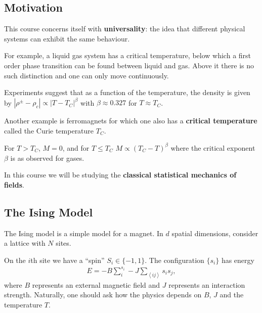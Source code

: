 
\subsection*{Motivation}

This course concerns itself with \textbf{universality}: the idea that different physical systems can exhibit the same behaviour.

For example, a liquid gas system has a critical temperature, below which a first order phase transition can be found between liquid and gas. Above it there is no such distinction and one can only move continuously.

Experiments suggest that as a function of the temperature, the density is given by $\left| \rho^{\pm} - \rho_c \right| \propto \left|  T - T_C \right|^{\beta}$ with $\beta \approx 0.327$ for $T \approx T_C$.

Another example is ferromagnets for which one also has a \textbf{critical temperature} called the Curie temperature $T_C$.

For $T > T_C$, $M = 0$, and for $T \leq T_C$ $M \propto \left( T_C - T \right)^{\beta}$ where the critical exponent $\beta$ is as observed for gases.

In this course we will be studying the \textbf{classical statistical mechanics of fields}.


\subsection{The Ising Model}

The Ising model is a simple model for a magnet. In $d$ spatial dimensions, consider a lattice with $N$ sites.

On the $i$th site we have a ``spin'' $S_{i} \in \{-1,1\} $. The configuration $\{s_{i}\} $ has energy 
\begin{align}
    E = - B \sum_{i}^{s_{i}} - J \sum_{\left<ij \right>}^{} s_{i} s_{j}
,\end{align}
where $B$ represents an external magnetic field and $J$ represents an interaction strength. Naturally, one should ask how the physics depends on $B$, $J$ and the temperature $T$.

